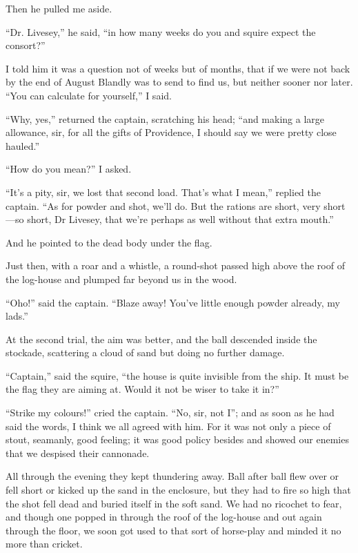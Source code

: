 Then he pulled me aside.

\enquote{Dr. Livesey,} he said, \enquote{in how many weeks do you and squire expect the consort?}

I told him it was a question not of weeks but of months, that if we were not back by the end of August Blandly was to send to find us, but neither sooner nor later. \enquote{You can calculate for yourself,} I said.

\enquote{Why, yes,} returned the captain, scratching his head; \enquote{and making a large allowance, sir, for all the gifts of Providence, I should say we were pretty close hauled.}

\enquote{How do you mean?} I asked.

\enquote{It’s a pity, sir, we lost that second load. That’s what I mean,} replied the captain. \enquote{As for powder and shot, we’ll do. But the rations are short, very short---so short, Dr Livesey, that we’re perhaps as well without that extra mouth.}

And he pointed to the dead body under the flag.

Just then, with a roar and a whistle, a round-shot passed high above the roof of the log-house and plumped far beyond us in the wood.

\enquote{Oho!} said the captain. \enquote{Blaze away! You’ve little enough powder already, my lads.}

At the second trial, the aim was better, and the ball descended inside the stockade, scattering a cloud of sand but doing no further damage.

\enquote{Captain,} said the squire, \enquote{the house is quite invisible from the ship. It must be the flag they are aiming at. Would it not be wiser to take it in?}

\enquote{Strike my colours!} cried the captain. \enquote{No, sir, not I}; and as soon as he had said the words, I think we all agreed with him. For it was not only a piece of stout, seamanly, good feeling; it was good policy besides and showed our enemies that we despised their cannonade.

All through the evening they kept thundering away. Ball after ball flew over or fell short or kicked up the sand in the enclosure, but they had to fire so high that the shot fell dead and buried itself in the soft sand. We had no ricochet to fear, and though one popped in through the roof of the log-house and out again through the floor, we soon got used to that sort of horse-play and minded it no more than cricket.

